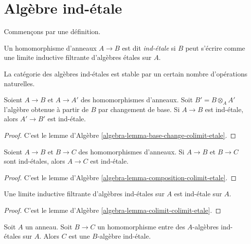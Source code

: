 \section{Algèbre ind-\'etale}
\label{section-ind-etale}

\noindent
Commençons par une définition.

\begin{definition}
\label{definition-ind-etale}
Un homomorphisme d'anneaux $A \to B$ est dit {\it ind-\'etale} si $B$ peut s'écrire
comme une limite inductive filtrante d'algèbres \'etales sur $A$.
\end{definition}

\noindent
La catégorie des algèbres ind-\'etales est stable par un certain nombre d'opérations
naturelles.

\begin{lemma}
\label{lemma-base-change-ind-etale}
Soient $A \to B$ et $A \to A'$ des homomorphismes d'anneaux. Soit $B' = B \otimes_A A'$
l'algèbre obtenue à partir de $B$ par changement de base.
Si $A \to B$ est ind-\'etale, alors $A' \to B'$ est ind-\'etale.
\end{lemma}

\begin{proof}
C'est le lemme d'Algèbre \ref{algebra-lemma-base-change-colimit-etale}.
\end{proof}

\begin{lemma}
\label{lemma-composition-ind-etale}
Soient $A \to B$ et $B \to C$ des homomorphismes d'anneaux. Si $A \to B$ et $B \to C$
sont ind-\'etales, alors $A \to C$ est ind-\'etale.
\end{lemma}

\begin{proof}
C'est le lemme d'Algèbre \ref{algebra-lemma-composition-colimit-etale}.
\end{proof}

\begin{lemma}
\label{lemma-ind-ind-etale}
Une limite inductive filtrante d'algèbres ind-\'etales sur $A$ est ind-\'etale sur $A$.
\end{lemma}

\begin{proof}
C'est le lemme d'Algèbre \ref{algebra-lemma-colimit-colimit-etale}.
\end{proof}

\begin{lemma}
\label{lemma-ind-etale-permanence}
Soit $A$ un anneau. Soit $B \to C$ un homomorphisme entre des $A$-algèbres ind-\'etales
sur $A$. Alors $C$ est une $B$-algèbre ind-\'etale.
\end{lemma}

